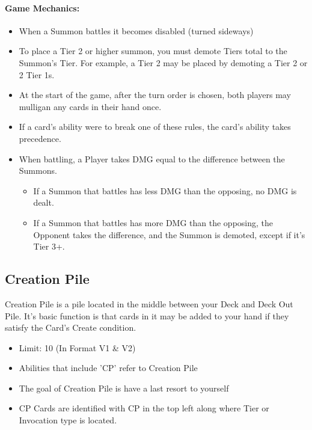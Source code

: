\documentclass[12pt, letterpaper]{article}
\begin{document}
\paragraph{Game Mechanics: \\}
\begin{itemize}
    \item When a Summon battles it becomes disabled (turned sideways)
    \item To place a Tier 2 or higher summon, you must demote Tiers total to the Summon's Tier. 
    For example, a Tier 2 may be placed by demoting a Tier 2 or 2 Tier 1s.
    \item At the start of the game, after the turn order is chosen, both players may mulligan any cards in their hand once.
    \item If a card’s ability were to break one of these rules, the card's ability takes precedence.
    \item When battling, a Player takes DMG equal to the difference between the Summons. 
    \begin{itemize}
        \item If a Summon that battles has less DMG than the opposing, no DMG is dealt.
        \item If a Summon that battles has more DMG than the opposing, the Opponent takes the difference, 
        and the Summon is demoted, except if it's Tier 3+. 
    \end{itemize} 
\end{itemize}

\newpage
\subsection{Creation Pile}
Creation Pile is a pile located in the middle between your Deck and Deck Out Pile. It's basic function is that 
cards in it may be added to your hand if they satisfy the Card's Create condition. 

\begin{itemize}
    \item Limit: 10 (In Format V1 \& V2)
    \item Abilities that include 'CP' refer to Creation Pile
    \item The goal of Creation Pile is have a last resort to yourself
    \item CP Cards are identified with CP in the top left along where Tier or Invocation type is located. 
\end{itemize}
\end{document}
